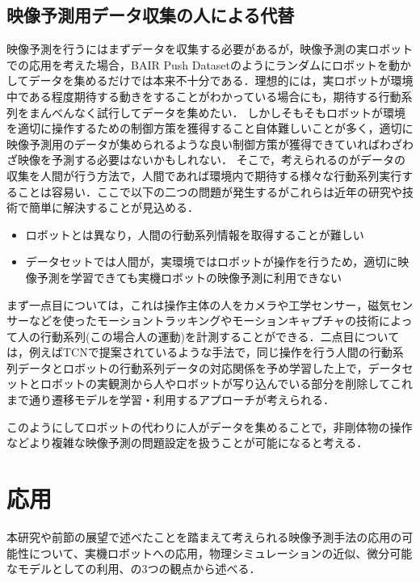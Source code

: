 \subsection{映像予測用データ収集の人による代替}
映像予測を行うにはまずデータを収集する必要があるが，映像予測の実ロボットでの応用を考えた場合，BAIR Push Datasetのようにランダムにロボットを動かしてデータを集めるだけでは本来不十分である．理想的には，実ロボットが環境中である程度期待する動きをすることがわかっている場合にも，期待する行動系列をまんべんなく試行してデータを集めたい．
しかしそもそもロボットが環境を適切に操作するための制御方策を獲得すること自体難しいことが多く，適切に映像予測用のデータが集められるような良い制御方策が獲得できていればわざわざ映像を予測する必要はないかもしれない．
そこで，考えられるのがデータの収集を人間が行う方法で，人間であれば環境内で期待する様々な行動系列実行することは容易い．ここで以下の二つの問題が発生するがこれらは近年の研究や技術で簡単に解決することが見込める．
\begin{itemize}
    \item ロボットとは異なり，人間の行動系列情報を取得することが難しい
    \item データセットでは人間が，実環境ではロボットが操作を行うため，適切に映像予測を学習できても実機ロボットの映像予測に利用できない
\end{itemize}

まず一点目については，これは操作主体の人をカメラや工学センサー，磁気センサーなどを使ったモーショントラッキングやモーションキャプチャの技術によって人の行動系列(この場合人の運動)を計測することができる．二点目については，例えばTCN\cite{Sermanet_2018}で提案されているような手法で，同じ操作を行う人間の行動系列データとロボットの行動系列データの対応関係を予め学習した上で，データセットとロボットの実観測から人やロボットが写り込んでいる部分を削除してこれまで通り遷移モデルを学習・利用するアプローチが考えられる．

このようにしてロボットの代わりに人がデータを集めることで，非剛体物の操作などより複雑な映像予測の問題設定を扱うことが可能になると考える．

\section{応用}

本研究や前節の展望で述べたことを踏まえて考えられる映像予測手法の応用の可能性について、実機ロボットへの応用，物理シミュレーションの近似、微分可能なモデルとしての利用、の3つの観点から述べる．

